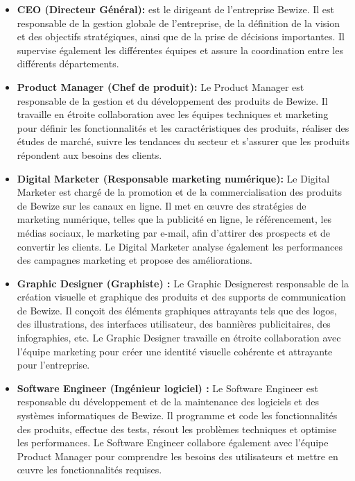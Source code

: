 \begin{itemize}
    \item[$\bullet$] \textbf{CEO (Directeur Général):}  est le dirigeant de l'entreprise Bewize. Il est responsable de la gestion globale de l'entreprise, de la définition de la vision et des objectifs stratégiques, ainsi que de la prise de décisions importantes. Il supervise également les différentes équipes et assure la coordination entre les différents départements. \\
    
    \item[$\bullet$] \textbf{Product Manager (Chef de produit):} Le Product Manager est responsable de la gestion et du développement des produits de Bewize. Il travaille en étroite collaboration avec les équipes techniques et marketing pour définir les fonctionnalités et les caractéristiques des produits, réaliser des études de marché, suivre les tendances du secteur et s'assurer que les produits répondent aux besoins des clients.\\
    
    \item[$\bullet$] \textbf{Digital Marketer (Responsable marketing numérique):}
    Le Digital Marketer est chargé de la promotion et de la commercialisation des produits de Bewize sur les canaux en ligne. Il met en œuvre des stratégies de marketing numérique, telles que la publicité en ligne, le référencement, les médias sociaux, le marketing par e-mail, afin d'attirer des prospects et de convertir les clients. Le Digital Marketer analyse également les performances des campagnes marketing et propose des améliorations.\\

    \item[$\bullet$] \textbf{Graphic Designer (Graphiste) :}  Le Graphic Designerest responsable de la création visuelle et graphique des produits et des supports de communication de Bewize. Il conçoit des éléments graphiques attrayants tels que des logos, des illustrations, des interfaces utilisateur, des bannières publicitaires, des infographies, etc. Le Graphic Designer travaille en étroite collaboration avec l'équipe marketing pour créer une identité visuelle cohérente et attrayante pour l'entreprise.\\
    
    \item[$\bullet$] \textbf{ Software Engineer (Ingénieur logiciel) :}  Le Software Engineer est responsable du développement et de la maintenance des logiciels et des systèmes informatiques de Bewize. Il programme et code les fonctionnalités des produits, effectue des tests, résout les problèmes techniques et optimise les performances. Le Software Engineer collabore également avec l'équipe Product Manager pour comprendre les besoins des utilisateurs et mettre en œuvre les fonctionnalités requises.\\
    

\end{itemize}
